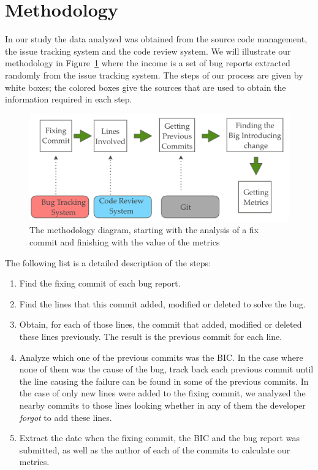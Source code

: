 \documentclass[10pt, conference]{IEEEtran}
\begin{document}
\section{Methodology}
\label{sec:methodology}

In our study the data analyzed was obtained from the source code management, the issue tracking system and the code review system. We will illustrate our methodology in Figure~\ref{fig:methodology} where the income is a set of bug reports extracted randomly from the issue tracking system. The steps of our process are given by white boxes; the colored boxes give the sources that are used to obtain the information required in each step.

\begin{figure}[ht]
\centering
\includegraphics[width=\columnwidth]{methodology.png}
\caption{The methodology diagram, starting with the analysis of a fix commit and finishing with the value of the metrics}
\label{fig:methodology}       %
\end{figure}

The following list is a detailed description of the steps: 

\begin{enumerate}
		\item Find the fixing commit of each bug report.
		\item Find the lines that this commit added, modified or deleted to solve the bug.
		\item Obtain, for each of those lines, the commit that added, modified or deleted these lines previously. The result is the previous commit for each line.
		\item Analyze which one of the previous commits was the BIC. In the case where none of them was the cause of the bug, track back each previous commit until the line causing the failure can be found in some of the previous commits. In the case of only new lines were added to the fixing commit, we analyzed the nearby commits to those lines looking whether in any of them the developer \emph{forgot} to add these lines.
		\item Extract the date when the fixing commit, the BIC and the bug report was submitted, as well as the author of each of the commits to calculate our metrics.	
\end{enumerate} 
\end{document}
